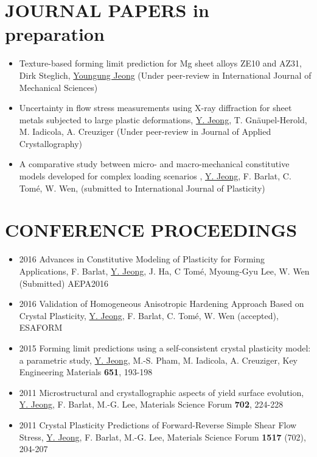\documentclass{res}
\begin{document}
\begin{resume}
  \section{JOURNAL PAPERS in preparation}
  \begin{itemize}
  \item Texture-based forming limit prediction for Mg sheet alloys ZE10 and AZ31, Dirk Steglich, \underline{Youngung Jeong} (Under peer-review in International Journal of Mechanical Sciences)
  \item Uncertainty in flow stress measurements using X-ray diffraction for sheet metals subjected to large plastic deformations, \underline{Y. Jeong}, T. Gn\"{a}upel-Herold, M. Iadicola, A. Creuziger (Under peer-review in Journal of Applied Crystallography)
  \item A comparative study between micro- and macro-mechanical constitutive models developed for complex loading scenarios , \underline{Y. Jeong}, F. Barlat, C. Tom\'{e}, W. Wen, (submitted to International Journal of Plasticity)
  \end{itemize}

  \section{CONFERENCE PROCEEDINGS}
  \begin{itemize}
  \item 2016 Advances in Constitutive Modeling of Plasticity for Forming Applications, F. Barlat, \underline{Y. Jeong}, J. Ha, C Tom\'{e}, Myoung-Gyu Lee, W. Wen (Submitted) AEPA2016
  \item 2016 Validation of Homogeneous Anisotropic Hardening Approach Based on Crystal Plasticity, \underline{Y. Jeong}, F. Barlat, C. Tom\'{e}, W. Wen (accepted), ESAFORM
  \item 2015 Forming limit predictions using a self-consistent crystal plasticity model: a parametric study, \underline{Y. Jeong}, M.-S. Pham, M. Iadicola, A. Creuziger, Key Engineering Materials {\bf 651}, 193-198
  \item 2011 Microstructural and crystallographic aspects of yield surface evolution, \underline{Y. Jeong}, F. Barlat, M.-G. Lee,  Materials Science Forum {\bf 702}, 224-228
  \item 2011 Crystal Plasticity Predictions of Forward-Reverse Simple Shear Flow Stress, \underline{Y. Jeong}, F. Barlat, M.-G. Lee, Materials Science Forum {\bf 1517} (702), 204-207
  \end{itemize}


\end{resume}
\end{document}
